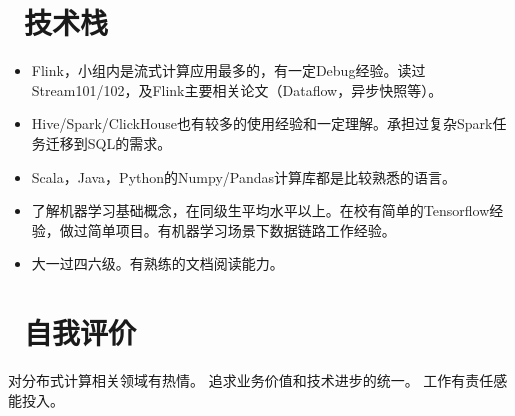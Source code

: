 \documentclass{resume}
\begin{document}
\section{\faCogs\ 技术栈}
\begin{itemize}[parsep=0.5ex]
  \item Flink，小组内是流式计算应用最多的，有一定Debug经验。读过Stream101/102，及Flink主要相关论文（Dataflow，异步快照等）。
  \item Hive/Spark/ClickHouse也有较多的使用经验和一定理解。承担过复杂Spark任务迁移到SQL的需求。
  \item Scala，Java，Python的Numpy/Pandas计算库都是比较熟悉的语言。
  \item 了解机器学习基础概念，在同级生平均水平以上。在校有简单的Tensorflow经验，做过简单项目。有机器学习场景下数据链路工作经验。
  \item 大一过四六级。有熟练的文档阅读能力。

  
\end{itemize}

\section{\faInfo\ 自我评价}
\begin{onehalfspacing}
对分布式计算相关领域有热情。
追求业务价值和技术进步的统一。
工作有责任感能投入。
\end{onehalfspacing}

%
%
\end{document}
